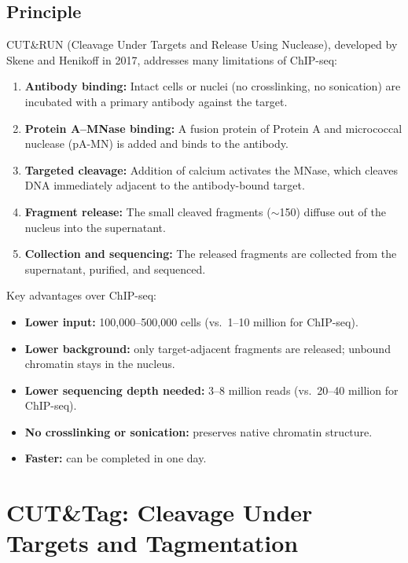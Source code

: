 \subsection{Principle}
\label{subsec:histones:cutrun-principle}

CUT\&RUN (Cleavage Under Targets and Release Using Nuclease), developed by Skene and Henikoff in 2017, addresses many limitations of ChIP-seq:

\begin{enumerate}[itemsep=2pt]
  \item \textbf{Antibody binding:} Intact cells or nuclei (no crosslinking, no sonication) are incubated with a primary antibody against the target.
  \item \textbf{Protein A--MNase binding:} A fusion protein of Protein A and micrococcal nuclease (pA-MN) is added and binds to the antibody.
  \item \textbf{Targeted cleavage:} Addition of calcium activates the MNase, which cleaves DNA immediately adjacent to the antibody-bound target.
  \item \textbf{Fragment release:} The small cleaved fragments ($\sim$150\basepair{}) diffuse out of the nucleus into the supernatant.
  \item \textbf{Collection and sequencing:} The released fragments are collected from the supernatant, purified, and sequenced.
\end{enumerate}

Key advantages over ChIP-seq:
\begin{itemize}[itemsep=2pt]
  \item \textbf{Lower input:} 100,000--500,000 cells (vs.\ 1--10 million for ChIP-seq).
  \item \textbf{Lower background:} only target-adjacent fragments are released; unbound chromatin stays in the nucleus.
  \item \textbf{Lower sequencing depth needed:} 3--8 million reads (vs.\ 20--40 million for ChIP-seq).
  \item \textbf{No crosslinking or sonication:} preserves native chromatin structure.
  \item \textbf{Faster:} can be completed in one day.
\end{itemize}

\section{CUT\&Tag: Cleavage Under Targets and Tagmentation}
\label{sec:histones:cuttag}

